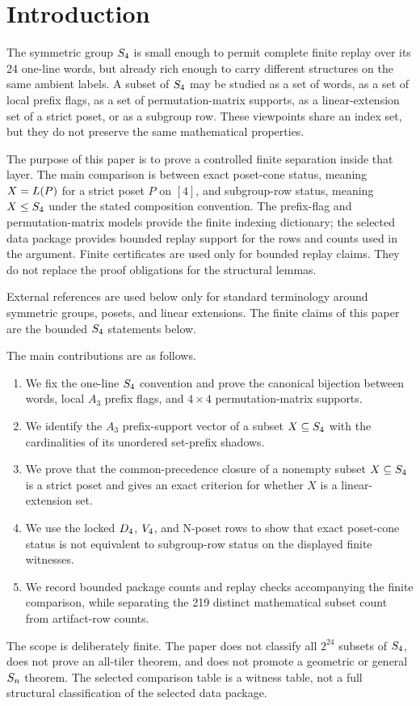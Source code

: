 \section{Introduction}
\label{sec:introduction}

The symmetric group \(S_4\) is small enough to permit complete finite replay over its 24 one-line words, but already rich enough to carry different structures on the same ambient labels. A subset of \(S_4\) may be studied as a set of words, as a set of local prefix flags, as a set of permutation-matrix supports, as a linear-extension set of a strict poset, or as a subgroup row. These viewpoints share an index set, but they do not preserve the same mathematical properties.

The purpose of this paper is to prove a controlled finite separation inside that layer. The main comparison is between exact poset-cone status, meaning \(X=L(P)\) for a strict poset \(P\) on \([4]\), and subgroup-row status, meaning \(X\le S_4\) under the stated composition convention. The prefix-flag and permutation-matrix models provide the finite indexing dictionary; the selected data package provides bounded replay support for the rows and counts used in the argument. Finite certificates are used only for bounded replay claims. They do not replace the proof obligations for the structural lemmas.

External references are used below only for standard terminology around symmetric groups, posets, and linear extensions. The finite claims of this paper are the bounded \(S_4\) statements below.

The main contributions are as follows.

\begin{enumerate}[label=(\roman*)]
\item We fix the one-line \(S_4\) convention and prove the canonical bijection between words, local \(A_3\) prefix flags, and \(4\times4\) permutation-matrix supports.
\item We identify the \(A_3\) prefix-support vector of a subset \(X\subseteq S_4\) with the cardinalities of its unordered set-prefix shadows.
\item We prove that the common-precedence closure of a nonempty subset \(X\subseteq S_4\) is a strict poset and gives an exact criterion for whether \(X\) is a linear-extension set.
\item We use the locked \(D_4\), \(V_4\), and N-poset rows to show that exact poset-cone status is not equivalent to subgroup-row status on the displayed finite witnesses.
\item We record bounded package counts and replay checks accompanying the finite comparison, while separating the 219 distinct mathematical subset count from artifact-row counts.
\end{enumerate}

The scope is deliberately finite. The paper does not classify all \(2^{24}\) subsets of \(S_4\), does not prove an all-tiler theorem, and does not promote a geometric or general \(S_n\) theorem. The selected comparison table is a witness table, not a full structural classification of the selected data package.
